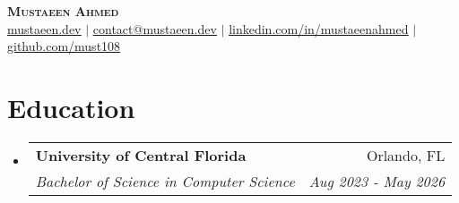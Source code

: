 \documentclass[letterpaper,11pt]{article}
\makeatletter
\newcommand{\resumeSubheading}[4]{
  \vspace{-2pt}\item
    \begin{tabular*}{0.97\textwidth}[t]{l@{\extracolsep{\fill}}r}
      \textbf{#1} & #2 \\
      \textit{\small#3} & \textit{\small #4} \\
    \end{tabular*}\vspace{-7pt}
}
\newcommand{\resumeSubHeadingListStart}{\begin{itemize}[leftmargin=0.15in, label={}]}
\newcommand{\resumeSubHeadingListEnd}{\end{itemize}}
\makeatother
\begin{document}


\begin{center}
    \textbf{\Huge \scshape Mustaeen Ahmed} \\ \vspace{1pt}
    \href{https://mustaeen.dev}{\ul{mustaeen.dev}} $|$ 
    \href{mailto:contact@mustaeen.dev}{\ul{contact@mustaeen.dev}} $|$ 
    \href{https://linkedin.com/in/mustaeenahmed}{\ul{linkedin.com/in/mustaeenahmed}} $|$
    \href{https://github.com/must108}{\ul{github.com/must108}} 
\end{center}


\section{Education}
  \resumeSubHeadingListStart
    \resumeSubheading
      {University of Central Florida}{Orlando, FL}
      {Bachelor of Science in Computer Science}{Aug 2023 - May 2026}
      
  \resumeSubHeadingListEnd

\end{document}
